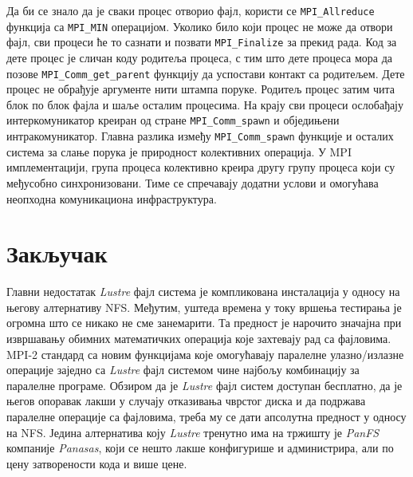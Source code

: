 Да би се знало да је сваки процес отворио фајл, користи се \texttt{MPI\_Allreduce} функција са \texttt{MPI\_MIN} операцијом. Уколико било који процес не може да отвори фајл, сви процеси ће то сазнати и позвати 
\texttt{MPI\_Finalize} за прекид рада. Код за дете процес је сличан коду родитеља процеса, с тим што дете процеса мора да позове \texttt{MPI\_Comm\_get\_parent} функцију да успостави контакт са родитељем. Дете процес не обрађује аргументе нити штампа поруке. Родитељ процес затим чита блок по блок фајла и шаље осталим процесима. На крају сви процеси ослобађају интеркомуникатор креиран од стране  \texttt{MPI\_Comm\_spawn} и обједињени интракомуникатор. Главна разлика између \texttt{MPI\_Comm\_spawn} функције и осталих  система за слање порука је природност колективних операција. У MPI имплементацији, група процеса колективно креира другу групу процеса који су међусобно синхронизовани. Тиме се спречавају додатни услови и омогућава неопходна комуникациона инфраструктура.

\chapter{Закључак}     

 Главни недостатак \textit{Lustre} фајл система је компликована инсталација у односу на његову алтернативу NFS. Међутим, уштеда времена у току вршења тестирања је огромна што се никако не сме занемарити. Та предност је нарочито значајна при извршавању обимних математичких операција које захтевају рад са фајловима. MPI-2 стандард са новим функцијама које омогућавају паралелне улазно/излазне операције заједно са \textit{Lustre} фајл системом чине најбољу комбинацију за паралелне програме. Обзиром да је \textit{Lustre} фајл систем доступан бесплатно, да је његов опоравак лакши у случају отказивања чврстог диска и да подржава паралелне операције са фајловима, треба му се дати апсолутна предност у односу на NFS. Једина алтернатива коју \textit{Lustre} тренутно има на тржишту је \textit{PanFS} компаније \textit{Panasas}, који се нешто лакше конфигурише и администрира, али по цену затворености кода и више цене. 

